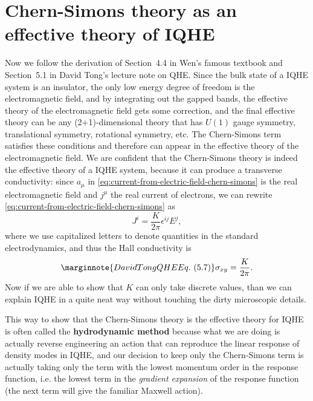 \documentclass[hyperref, a4paper]{article}
\newcommand*{\concept}[1]{{\textbf{#1}}}
\begin{document}
\section{Chern-Simons theory as an effective theory of IQHE}

Now we follow the derivation of Section~4.4 in Wen's famous textbook and Section~5.1 in David Tong's lecture 
note on QHE. 
Since the bulk state of a IQHE system is an insulator, the only low energy degree of freedom is the electromagnetic 
field, and by integrating out the gapped bands, the effective theory of the electromagnetic field gets some 
correction, and the final effective theory can be any (2+1)-dimensional theory that has $U(1)$ gauge 
symmetry, translational symmetry, rotational symmetry, etc. The Chern-Simons term satisfies these 
conditions and therefore can appear in the effective theory of the electromagnetic field. We are 
confident that the Chern-Simons theory is indeed the effective theory of a IQHE system, because it 
can produce a transverse conductivity: since $a_\mu$ in \eqref{eq:current-from-electric-field-chern-simons} is 
the real electromagnetic field and $j^\mu$ the real current of electrons, we can rewrite 
\eqref{eq:current-from-electric-field-chern-simons} 
as 
\begin{equation}
    J^i = \frac{K}{2\pi} \epsilon^{ij} E^j,
    \label{eq:iqhe-eom}
\end{equation}
where we use capitalized letters to denote quantities in the standard electrodynamics,
and thus the Hall conductivity is 
\begin{equation} \marginnote{David Tong QHE Eq.~(5.7)}
    \sigma_{xy} = \frac{K}{2\pi}. 
\end{equation}
Now if we are able to show that $K$ can only take discrete values, than we can explain IQHE in a quite 
neat way without touching the dirty microscopic details.

This way to show that the Chern-Simons theory is the effective theory for IQHE is often called the 
\concept{hydrodynamic method} because what we are doing is actually reverse engineering an action that 
can reproduce the linear response of density modes in IQHE, and our decision to keep only the Chern-Simons term 
is actually taking only the term with the lowest momentum order in the response function, i.e. the lowest 
term in the \emph{gradient expansion} of the response function (the next term will give the familiar Maxwell 
action). 
\end{document}
